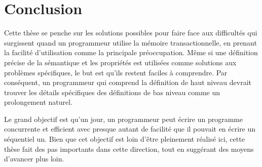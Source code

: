 \section{Conclusion}

Cette thèse se penche sur les solutions possibles pour faire face aux difficultés qui surgissent quand un programmeur utilise la mémoire transactionnelle, en prenant la facilité d'utilisation comme la principale préoccupation.
Même si une définition précise de la sémantique et les propriétés est utilisées comme solutions aux problèmes spécifiques, le but est qu'ils restent faciles à comprendre.
Par conséquent, un programmeur qui comprend la définition de haut niveau devrait trouver les détails spécifiques des définitions de bas niveau comme un prolongement naturel.



Le grand objectif est qu'un jour, un programmeur peut écrire un programme concurrente et efficient avec presque autant de facilité que il pouvait en écrire un séquentiel un.
Bien que cet objectif est loin d'être pleinement réalisé ici, cette thèse fait des pas importants dans cette direction, tout en suggérant des moyens d'avancer plus loin.



